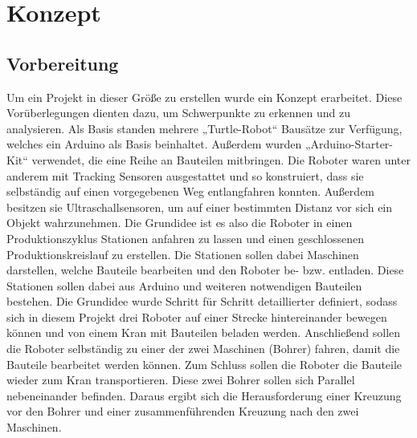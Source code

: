 \chapter{Konzept}


\section{Vorbereitung}
Um ein Projekt in dieser Größe zu erstellen wurde ein Konzept erarbeitet. Diese Vorüberlegungen dienten dazu, um Schwerpunkte zu erkennen und zu analysieren. Als Basis standen mehrere „Turtle-Robot“ Bausätze zur Verfügung, welches ein Arduino als Basis beinhaltet. Außerdem wurden „Arduino-Starter-Kit“ verwendet, die eine Reihe an Bauteilen mitbringen. Die Roboter waren unter anderem mit Tracking Sensoren ausgestattet und so konstruiert, dass sie selbständig auf einen vorgegebenen Weg entlangfahren konnten. Außerdem besitzen sie Ultraschallsensoren, um auf einer bestimmten Distanz vor sich ein Objekt wahrzunehmen.  
Die Grundidee ist es also die Roboter in einen Produktionszyklus Stationen anfahren zu lassen und einen geschlossenen Produktionskreislauf zu erstellen. Die Stationen sollen dabei Maschinen darstellen, welche Bauteile bearbeiten und den Roboter be- bzw. entladen. Diese Stationen sollen dabei aus Arduino und weiteren notwendigen Bauteilen bestehen. Die Grundidee wurde Schritt für Schritt detaillierter definiert, sodass sich in diesem Projekt drei Roboter auf einer Strecke hintereinander bewegen können und von einem Kran mit Bauteilen beladen werden. Anschließend sollen die Roboter selbständig zu einer der zwei Maschinen (Bohrer) fahren, damit die Bauteile bearbeitet werden können. Zum Schluss sollen die Roboter die Bauteile wieder zum Kran transportieren. Diese zwei Bohrer sollen sich Parallel nebeneinander befinden. Daraus ergibt sich die Herausforderung einer Kreuzung vor den Bohrer und einer zusammenführenden Kreuzung nach den zwei Maschinen.
 
